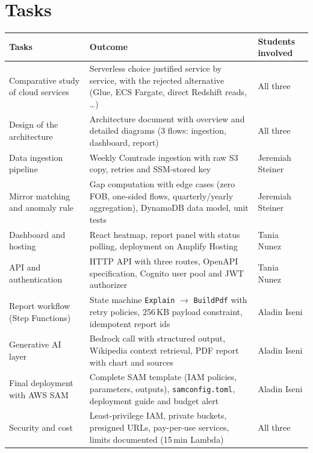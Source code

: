 \documentclass[10pt,a4paper]{article}
\begin{document}
\section*{Tasks}
\renewcommand{\arraystretch}{1.12}
\begin{tabularx}{\textwidth}{@{}>{\raggedright\arraybackslash}p{4.3cm} X >{\raggedright\arraybackslash}p{2.9cm}@{}}
\toprule
\textbf{Tasks} & \textbf{Outcome} & \textbf{Students involved} \\
\midrule
Comparative study of cloud services & Serverless choice justified service by service, with the rejected alternative (Glue, ECS Fargate, direct Redshift reads, \dots) & All three \\
Design of the architecture & Architecture document with overview and detailed diagrams (3 flows: ingestion, dashboard, report) & All three \\
Data ingestion pipeline & Weekly Comtrade ingestion with raw S3 copy, retries and SSM-stored key & Jeremiah Steiner \\
Mirror matching and anomaly rule & Gap computation with edge cases (zero FOB, one-sided flows, quarterly/yearly aggregation), DynamoDB data model, unit tests & Jeremiah Steiner \\
Dashboard and hosting & React heatmap, report panel with status polling, deployment on Amplify Hosting & Tania Nunez \\
API and authentication & HTTP API with three routes, OpenAPI specification, Cognito user pool and JWT authorizer & Tania Nunez \\
Report workflow (Step Functions) & State machine \texttt{Explain} $\rightarrow$ \texttt{BuildPdf} with retry policies, 256\,KB payload constraint, idempotent report ids & Aladin Iseni \\
Generative AI layer & Bedrock call with structured output, Wikipedia context retrieval, PDF report with chart and sources & Aladin Iseni \\
Final deployment with AWS SAM & Complete SAM template (IAM policies, parameters, outputs), \texttt{samconfig.toml}, deployment guide and budget alert & Aladin Iseni \\
Security and cost & Least-privilege IAM, private buckets, presigned URLs, pay-per-use services, limits documented (15\,min Lambda) & All three \\
\bottomrule
\end{tabularx}
\end{document}
